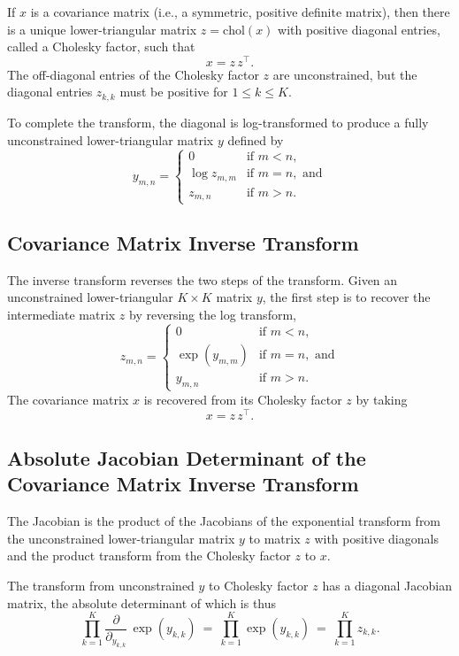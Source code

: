 If $x$ is a covariance matrix (i.e., a symmetric, positive definite
matrix), then there is a unique lower-triangular matrix $z =
\mbox{chol}(x)$ with positive diagonal entries, called a Cholesky
factor, such that
\[
x = z \, z^{\top}.
\]
The off-diagonal entries of the Cholesky factor $z$ are unconstrained,
but the diagonal entries $z_{k,k}$ must be positive for $1 \leq k
\leq K$.

To complete the transform, the diagonal is log-transformed to produce
a fully unconstrained lower-triangular matrix $y$ defined by
\[
y_{m,n} =
\left\{
\begin{array}{cl}
0 & \mbox{if } m < n,
\\[4pt]
\log z_{m,m} & \mbox{if } m = n, \mbox{ and}
\\[4pt]
z_{m,n} & \mbox{if } m > n.
\end{array}
\right.
\]

\subsection{Covariance Matrix Inverse Transform}

The inverse transform reverses the two steps of the transform.
Given an unconstrained lower-triangular $K \times K$ matrix $y$, the
first step is to recover the intermediate matrix $z$ by reversing the
log transform,
\[
z_{m,n} =
\left\{
\begin{array}{cl}
0 & \mbox{if } m < n,
\\[4pt]
\exp(y_{m,m}) & \mbox{if } m = n, \mbox{ and}
\\[4pt]
y_{m,n} & \mbox{if } m > n.
\end{array}
\right.
\]
%
The covariance matrix $x$ is recovered from its Cholesky factor $z$ by
taking
%
\[
x = z \, z^{\top}.
\]

\subsection{Absolute Jacobian Determinant of the Covariance
  Matrix Inverse Transform}

The Jacobian is the product of the Jacobians of the exponential
transform from the unconstrained lower-triangular matrix $y$ to matrix
$z$ with positive diagonals and the product transform from the
Cholesky factor $z$ to $x$.

The transform from unconstrained $y$ to Cholesky factor $z$ has a
diagonal Jacobian matrix, the absolute determinant of which is thus
%
\[
\prod_{k=1}^K  \frac{\partial}{\partial_{y_{k,k}}} \, \exp(y_{k,k})
\ = \
\prod_{k=1}^K \exp(y_{k,k})
\ = \
\prod_{k=1}^K z_{k,k}.
\]

